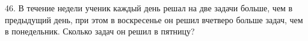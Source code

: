 46. В течение недели ученик каждый день решал на две задачи больше, чем в предыдущий день, при этом в воскресенье он решил вчетверо больше задач, чем в понедельник. Сколько задач он решил в пятницу?\\
